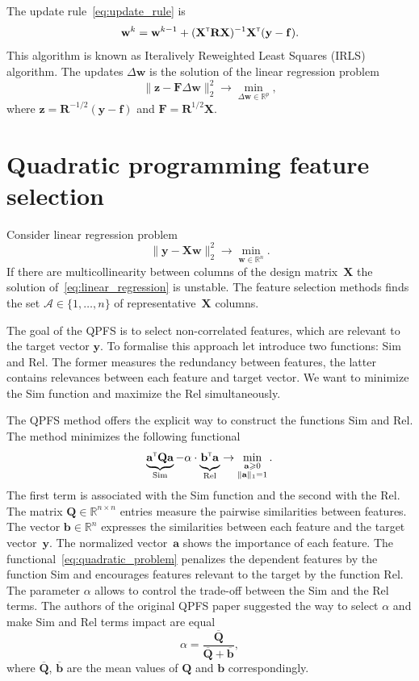 \documentclass[a4paper,12pt]{article}
\renewcommand{\geq}{\ensuremath{\geqslant}}
\theoremstyle{plain} %
\theoremstyle{definition} %
\theoremstyle{remark} %
\newcommand{\ba}{\mathbf{a}}
\newcommand{\bb}{\mathbf{b}}
\newcommand{\bw}{\mathbf{w}}
\newcommand{\by}{\mathbf{y}}
\newcommand{\bz}{\mathbf{z}}
\newcommand{\cA}{\mathcal{A}}
\newcommand{\bQ}{\mathbf{Q}}
\newcommand{\bbR}{\mathbb{R}}
\newcommand{\bF}{\mathbf{F}}
\newcommand{\bR}{\mathbf{R}}
\newcommand{\bX}{\mathbf{X}}
\newcommand{\T}{{\text{\tiny\sffamily\upshape\mdseries T}}}
\begin{document}
	The update rule~\eqref{eq:update_rule} is
	\[
		\bw^k = \bw^{k - 1} + (\bX^{\T} \bR \bX)^{-1} \bX^{\T} (\by - \mathbf{f}).
	\]
	This algorithm is known as Iteralively Reweighted Least Squares (IRLS) algorithm. The updates $\Delta \bw$ is the solution of the linear regression problem
	\begin{equation}
		\| \bz - \bF \Delta \bw \|_2^2 \rightarrow \min_{\Delta \bw \in \bbR^{p}},
		\label{eq:lin_reg_log_reg}
	\end{equation}
where $\bz = \bR^{-1/2} (\by - \mathbf{f})$ and $\bF = \bR^{1/2}\bX$.
	
	\section*{Quadratic programming feature selection}
	Consider linear regression problem
	\begin{equation}
		 \| \by - \bX \bw\|_2^2 \rightarrow\min_{\bw \in \bbR^{n}}.
		 \label{eq:linear_regression}
	\end{equation}
	If there are multicollinearity between columns of the design matrix~$\bX$ the solution of~\eqref{eq:linear_regression} is unstable. The feature selection methods finds the set $\cA \in \{1, \dots, n\}$ of representative~$\bX$ columns. 
	
	The goal of the QPFS is to select non-correlated features, which are relevant to the target vector $\by$.
	To formalise this approach let introduce two functions: Sim and Rel. 
	The former measures the redundancy between features, the latter contains relevances between each feature and target vector. 
	We want to minimize the Sim function and maximize the Rel simultaneously.
	
	The QPFS method offers the explicit way to construct the functions Sim and Rel. 
	The method minimizes the following functional
	\begin{equation}
		\underbrace{\ba^{\T} \bQ \ba}_{\text{Sim}} - \alpha \cdot \underbrace{\vphantom{()} \mathbf{b}^{\T} \ba}_{\text{Rel}} \rightarrow \min_{\substack{\ba \geq 0 \\ \|\ba\|_1=1}}.
		\label{eq:quadratic_problem}
	\end{equation}
	The first term is associated with the Sim function and the second with the Rel. 
  	The matrix $\bQ \in \bbR^{n \times n}$ entries measure the pairwise similarities between features. 
  	The vector $\mathbf{b} \in \bbR^n$ expresses the similarities between each feature and the target vector~$\by$.
  	The normalized vector~$\ba$ shows the importance of each feature. 
  	The functional~\eqref{eq:quadratic_problem} penalizes the dependent features by the function Sim and encourages features relevant to the target by the function Rel. 
  	The parameter $\alpha$ allows to control the trade-off between the Sim and the Rel terms.
  	The authors of the original QPFS paper suggested the way to select $\alpha$ and make Sim and Rel terms impact are equal
  	\begin{equation*}
  		\alpha = \frac{\overline{\bQ}}{\overline{\bQ} + \overline{\bb}},
  	\end{equation*}
  	where $\overline{\bQ}$, $\overline{\bb}$ are the mean values of $\bQ$ and $\bb$ correspondingly.
  	
\end{document}
